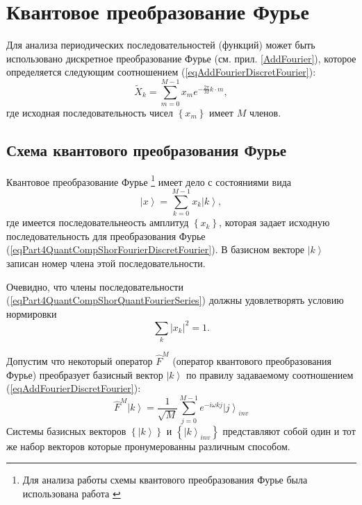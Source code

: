 \section{Квантовое преобразование Фурье}
Для анализа периодических последовательностей (функций) может быть
использовано дискретное преобразование Фурье
(см. прил. \ref{AddFourier}), которое определяется следующим соотношением
(\ref{eqAddFourierDiscretFourier}):
\begin{equation}
\tilde{X}_k = \sum^{M - 1}_{m = 0} x_m e^{-\frac{2 \pi}{M} k\cdot m},
\label{eqPart4QuantCompShorFourierDiscretFourier}
\end{equation}
где исходная последовательность чисел $\left\{x_m\right\}$ имеет $M$
членов. 

\subsection{Схема квантового преобразования Фурье}
Квантовое преобразование Фурье
\footnote{Для анализа работы схемы квантового преобразования Фурье
  была использована работа \cite{DBLP:conf/new2an/2015}}
имеет дело с состояниями вида 
\begin{equation}
\left|x\right> = \sum_{k = 0}^{M - 1}x_k \left|k\right>,
\label{eqPart4QuantCompShorQuantFourierSeries}
\end{equation}
где имеется последовательнеость амплитуд $\left\{x_k\right\}$, которая
задает исходную последовательность для преобразования Фурье 
(\ref{eqPart4QuantCompShorFourierDiscretFourier}). В базисном векторе
$\left|k\right>$ записан номер члена этой последовательности.   

Очевидно, что члены последовательности
(\ref{eqPart4QuantCompShorQuantFourierSeries})  должны удовлетворять
условию нормировки 
\[
\sum_k\left|x_k\right|^2 = 1.
\]

Допустим что некоторый оператор $\hat{F}^{M}$ (оператор квантового
преобразования Фурье) преобразует базисный вектор $\left|k\right>$ по
правилу задаваемому соотношением (\ref{eqAddFourierDiscretFourier}):
\begin{equation}
\hat{F}^{M}\left|k\right> = \frac{1}{\sqrt{M}}\sum_{j = 0}^{M -1}
e^{-i \omega k j}\left|j\right>_{inv} 
\label{eqPart4QuantCompShorQuantFourierBasis}
\end{equation}
Системы базисных векторов $\left\{\left|k\right>\right\}$ и 
$\left\{\left|k\right>_{inv}\right\}$ представляют собой один и тот же
набор векторов которые пронумерованны различным способом.

